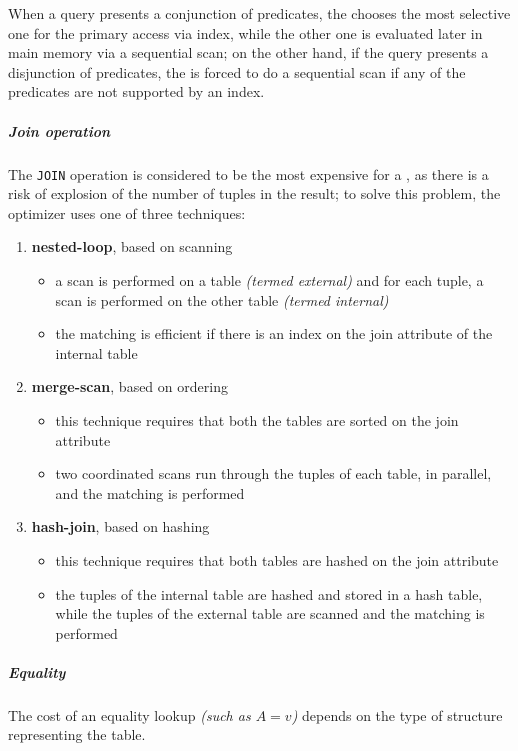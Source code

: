 \documentclass[english]{article}
\begin{document}
When a query presents a conjunction of predicates, the \dbms chooses the most selective one for the primary access via index, while the other one is evaluated later in main memory via a sequential scan;
on the other hand, if the query presents a disjunction of predicates, the \dbms is forced to do a sequential scan if any of the predicates are not supported by an index.

\subparagraph*{Join operation}
The \texttt{JOIN} operation is considered to be the most expensive for a \dbms, as there is a risk of explosion of the number of tuples in the result;
to solve this problem, the optimizer uses one of three techniques:

\begin{enumerate}
  \item \textbf{nested-loop}, based on scanning
        \begin{itemize}
          \item a scan is performed on a table \textit{(termed external)} and for each tuple, a scan is performed on the other table \textit{(termed internal)}
          \item the matching is efficient if there is an index on the join attribute of the internal table
        \end{itemize}
  \item \textbf{merge-scan}, based on ordering
        \begin{itemize}
          \item this technique requires that both the tables are sorted on the join attribute
          \item two coordinated scans run through the tuples of each table, in parallel, and the matching is performed
        \end{itemize}
  \item \textbf{hash-join}, based on hashing
        \begin{itemize}
          \item this technique requires that both tables are hashed on the join attribute
          \item the tuples of the internal table are hashed and stored in a hash table, while the tuples of the external table are scanned and the matching is performed
        \end{itemize}
\end{enumerate}

\subparagraph*{Equality}
The cost of an equality lookup \textit{(such as \(A = v\))} depends on the type of structure representing the table.
\end{document}
